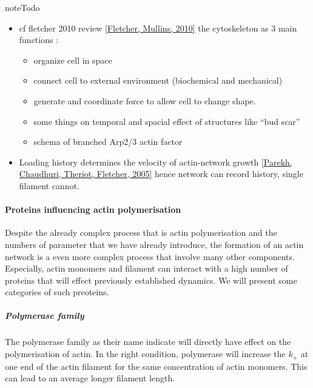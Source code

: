\documentclass[A4paperpaper,11pt,english]{sphinxmanual}
\begin{document}
\begin{notice}{note}{Todo}
\begin{itemize}
\item {} 
cf fletcher 2010 review {\hyperref[bibitem:fletcher2010]{{[}Fletcher, Mullins,  2010{]}}} the cytoskeleton as 3 main
functions :
\begin{itemize}
\item {} 
organize cell in space

\item {} 
connect cell to external environment (biochemical and mechanical)

\item {} 
generate and coordinate force to allow cell to change shape.

\item {} 
some things on temporal and spacial effect of structures like ``bud scar''

\item {} 
schema of branched Arp2/3 actin factor

\end{itemize}

\item {} 
Loading history determines the velocity of actin-network growth
{\hyperref[bibitem:parekh2005]{{[}Parekh, Chaudhuri, Theriot, Fletcher,  2005{]}}} hence network can record history, single filament
cannot.

\end{itemize}
\end{notice}


\paragraph{Proteins influencing actin polymerisation}
\label{parts/part1:proteins-influencing-actin-polymerisation}
Despite the already complex process that is actin polymerisation and the
numbers of parameter that we have already introduce, the formation of an actin
network is a even more complex process that involve many other components.
Especially, actin monomers and filament can interact with a high number of
proteins that will effect previously established dynamics.  We will present
some categories of such preoteins.


\subparagraph{Polymerase family}
\label{parts/part1:polymerase-family}
The polymerase family as their name indicate will directly have effect on the
polymerisation of actin. In the right condition, polymerase will increase the
\(k_+\) at one end of the actin filament for the same concentration of
actin monomers. This can lead to an average longer filament length.
\end{document}
